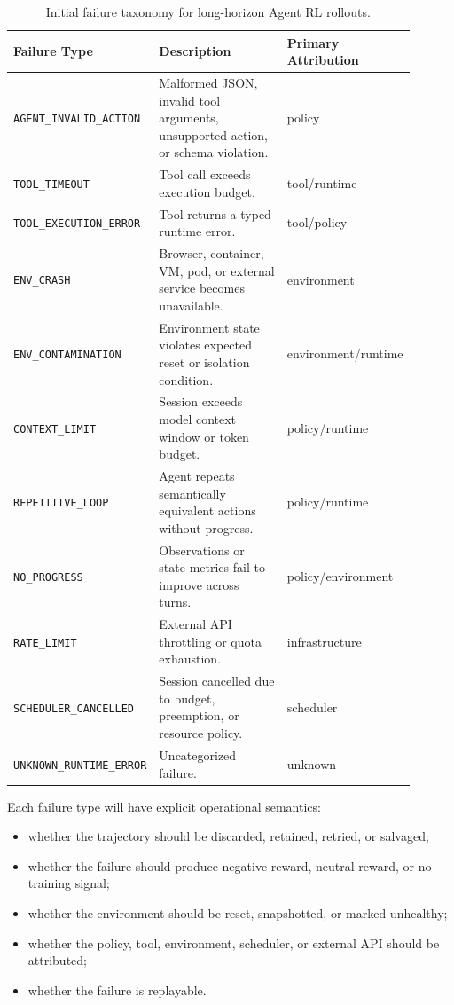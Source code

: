 \documentclass[11pt]{article}
\begin{document}
\begin{table}[t]
\centering
\small
\begin{tabular}{p{0.27\linewidth}p{0.44\linewidth}p{0.19\linewidth}}
\toprule
\textbf{Failure Type} & \textbf{Description} & \textbf{Primary Attribution}\\
\midrule
\texttt{AGENT\_INVALID\_ACTION} & Malformed JSON, invalid tool arguments, unsupported action, or schema violation. & policy \\
\texttt{TOOL\_TIMEOUT} & Tool call exceeds execution budget. & tool/runtime \\
\texttt{TOOL\_EXECUTION\_ERROR} & Tool returns a typed runtime error. & tool/policy \\
\texttt{ENV\_CRASH} & Browser, container, VM, pod, or external service becomes unavailable. & environment \\
\texttt{ENV\_CONTAMINATION} & Environment state violates expected reset or isolation condition. & environment/runtime \\
\texttt{CONTEXT\_LIMIT} & Session exceeds model context window or token budget. & policy/runtime \\
\texttt{REPETITIVE\_LOOP} & Agent repeats semantically equivalent actions without progress. & policy/runtime \\
\texttt{NO\_PROGRESS} & Observations or state metrics fail to improve across turns. & policy/environment \\
\texttt{RATE\_LIMIT} & External API throttling or quota exhaustion. & infrastructure \\
\texttt{SCHEDULER\_CANCELLED} & Session cancelled due to budget, preemption, or resource policy. & scheduler \\
\texttt{UNKNOWN\_RUNTIME\_ERROR} & Uncategorized failure. & unknown \\
\bottomrule
\end{tabular}
\caption{Initial failure taxonomy for long-horizon Agent RL rollouts.}
\label{tab:failure-taxonomy}
\end{table}

Each failure type will have explicit operational semantics:

\begin{itemize}[leftmargin=*]
    \item whether the trajectory should be discarded, retained, retried, or salvaged;
    \item whether the failure should produce negative reward, neutral reward, or no training signal;
    \item whether the environment should be reset, snapshotted, or marked unhealthy;
    \item whether the policy, tool, environment, scheduler, or external API should be attributed;
    \item whether the failure is replayable.
\end{itemize}
\end{document}
